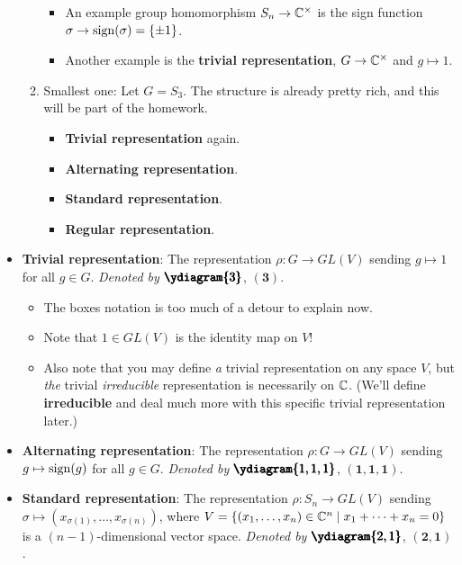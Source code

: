 \documentclass[../notes.tex]{subfiles}
\begin{document}
\begin{itemize}
\begin{enumerate}
        \begin{itemize}
            \item An example group homomorphism $S_n\to\mathbb{C}^\times$ is the sign function $\sigma\to\operatorname{sign}(\sigma)=\{\pm 1\}$.
            \item Another example is the \textbf{trivial representation}, $G\to\mathbb{C}^\times$ and $g\mapsto 1$.
        \end{itemize}
        \item Smallest one: Let $G=S_3$. The structure is already pretty rich, and this will be part of the homework.
        \begin{itemize}
            \item \textbf{Trivial representation} again.
            \item \textbf{Alternating representation}.
            \item \textbf{Standard representation}.
            \item \textbf{Regular representation}.
        \end{itemize}
    \end{enumerate}
    \item \textbf{Trivial representation}: The representation $\rho:G\to GL(V)$ sending $g\mapsto 1$ for all $g\in G$. \emph{Denoted by} $\pmb{\ydiagram{3}}$, $\bm{(3)}$.
    \begin{itemize}
        \item The boxes notation is too much of a detour to explain now.
        \item Note that $1\in GL(V)$ is the identity map on $V$!
        \item Also note that you may define \emph{a} trivial representation on any space $V$, but \emph{the} trivial \emph{irreducible} representation is necessarily on $\mathbb{C}$. (We'll define \textbf{irreducible} and deal much more with this specific trivial representation later.)
    \end{itemize}
    \item \textbf{Alternating representation}: The representation $\rho:G\to GL(V)$ sending $g\mapsto\operatorname{sign}(g)$ for all $g\in G$. \emph{Denoted by} $\pmb{\ydiagram{1,1,1}}$, $\bm{(1,1,1)}$.
    \item \textbf{Standard representation}: The representation $\rho:S_n\to GL(V)$ sending $\sigma\mapsto(x_{\sigma(1)},\dots,x_{\sigma(n)})$, where $V=\{(x_1,\dots,x_n)\in\mathbb{C}^n\mid x_1+\cdots+x_n=0\}$ is a $(n-1)$-dimensional vector space. \emph{Denoted by} $\pmb{\ydiagram{2,1}}$, $\bm{(2,1)}$.
    \begin{itemize}

\end{itemize}
\end{itemize}
\end{document}
